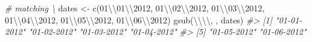 \documentclass[
]{book}
\newenvironment{Shaded}{\begin{snugshade}}{\end{snugshade}}
\newcommand{\CommentTok}[1]{\textcolor[rgb]{0.56,0.35,0.01}{\textit{#1}}}
\newcommand{\FunctionTok}[1]{\textcolor[rgb]{0.00,0.00,0.00}{#1}}
\newcommand{\NormalTok}[1]{#1}
\newcommand{\OtherTok}[1]{\textcolor[rgb]{0.56,0.35,0.01}{#1}}
\newcommand{\SpecialCharTok}[1]{\textcolor[rgb]{0.00,0.00,0.00}{#1}}
\newcommand{\StringTok}[1]{\textcolor[rgb]{0.31,0.60,0.02}{#1}}
\begin{document}
\begin{Shaded}
\begin{Highlighting}[]
\CommentTok{\# matching \textbackslash{}}
\NormalTok{dates }\OtherTok{\textless{}{-}} 
  \FunctionTok{c}\NormalTok{(}\StringTok{\textquotesingle{}01}\SpecialCharTok{\textbackslash{}\textbackslash{}}\StringTok{01}\SpecialCharTok{\textbackslash{}\textbackslash{}}\StringTok{2012\textquotesingle{}}\NormalTok{, }\StringTok{\textquotesingle{}01}\SpecialCharTok{\textbackslash{}\textbackslash{}}\StringTok{02}\SpecialCharTok{\textbackslash{}\textbackslash{}}\StringTok{2012\textquotesingle{}}\NormalTok{, }\StringTok{\textquotesingle{}01}\SpecialCharTok{\textbackslash{}\textbackslash{}}\StringTok{03}\SpecialCharTok{\textbackslash{}\textbackslash{}}\StringTok{2012\textquotesingle{}}\NormalTok{, }
    \StringTok{\textquotesingle{}01}\SpecialCharTok{\textbackslash{}\textbackslash{}}\StringTok{04}\SpecialCharTok{\textbackslash{}\textbackslash{}}\StringTok{2012\textquotesingle{}}\NormalTok{, }\StringTok{\textquotesingle{}01}\SpecialCharTok{\textbackslash{}\textbackslash{}}\StringTok{05}\SpecialCharTok{\textbackslash{}\textbackslash{}}\StringTok{2012\textquotesingle{}}\NormalTok{, }\StringTok{\textquotesingle{}01}\SpecialCharTok{\textbackslash{}\textbackslash{}}\StringTok{06}\SpecialCharTok{\textbackslash{}\textbackslash{}}\StringTok{2012\textquotesingle{}}\NormalTok{)}
\FunctionTok{gsub}\NormalTok{(}\StringTok{\textquotesingle{}}\SpecialCharTok{\textbackslash{}\textbackslash{}\textbackslash{}\textbackslash{}}\StringTok{\textquotesingle{}}\NormalTok{, }\StringTok{\textquotesingle{}{-}\textquotesingle{}}\NormalTok{, dates)}
\CommentTok{\#\textgreater{} [1] "01{-}01{-}2012" "01{-}02{-}2012" "01{-}03{-}2012" "01{-}04{-}2012"}
\CommentTok{\#\textgreater{} [5] "01{-}05{-}2012" "01{-}06{-}2012"}


\end{Highlighting}
\end{Shaded}
\end{document}
